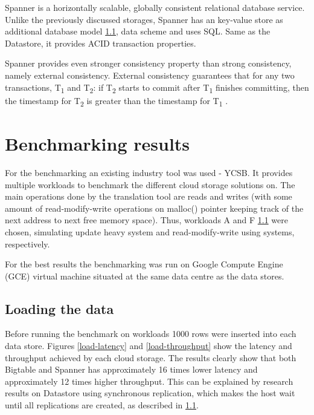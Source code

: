 \documentclass[bsc,frontabs,twoside,singlespacing,parskip,deptreport]{infthesis}     %
\begin{document}
Spanner is a horizontally scalable, globally consistent relational database service. Unlike the previously discussed storages, Spanner has an key-value store as additional database model \ref{}, data scheme and uses SQL. Same as the Datastore, it provides ACID transaction properties.

Spanner provides even stronger consistency property than strong consistency, namely external consistency. External consistency guarantees that for any two transactions, T\textsubscript{1} and T\textsubscript{2}: if T\textsubscript{2} starts to commit after T\textsubscript{1} finishes committing, then the timestamp for T\textsubscript{2} is greater than the timestamp for T\textsubscript{1} . 


\section{Benchmarking results}

For the benchmarking an existing industry tool was used - YCSB. It provides multiple workloads to benchmark the different cloud storage solutions on. The main operations done by the translation tool are reads and writes (with some amount of read-modify-write operations on malloc() pointer keeping track of the next address to next free memory space). Thus, workloads A and F \ref{} were chosen, simulating update heavy system and read-modify-write using systems, respectively.


For the best results the benchmarking was run on Google Compute Engine (GCE) virtual machine situated at the same data centre as the data stores.

\subsection{Loading the data}

Before running the benchmark on workloads 1000 rows were inserted into each data store. Figures \ref{load-latency} and \ref{load-throughput} show the latency and throughput achieved by each cloud storage. The results clearly show that both Bigtable and Spanner has approximately 16 times lower latency and approximately 12 times higher throughput. This can be explained by research results on Datastore using synchronous replication, which makes the host wait until all replications are created, as described in \ref{}.
\end{document}
